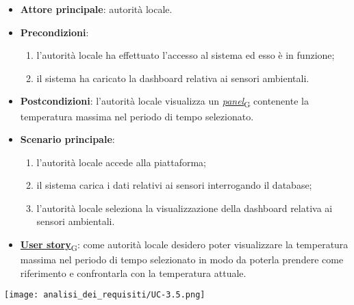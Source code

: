 \begin{itemize}
	\item \textbf{Attore principale}: autorità locale.
	\item \textbf{Precondizioni}:
	      \begin{enumerate}
		      \item l'autorità locale ha effettuato l'accesso al sistema ed esso è in funzione;
		      \item il sistema ha caricato la dashboard relativa ai sensori ambientali.
	      \end{enumerate}
	\item \textbf{Postcondizioni}: l'autorità locale visualizza un \href{https://7last.github.io/docs/pb/documentazione-interna/glossario\#panel}{\textit{panel}\textsubscript{G}} contenente la temperatura massima nel periodo di tempo selezionato.
	\item \textbf{Scenario principale}:
	      \begin{enumerate}
		      \item l'autorità locale accede alla piattaforma;
		      \item il sistema carica i dati relativi ai sensori interrogando il database;
		      \item l'autorità locale seleziona la visualizzazione della dashboard relativa ai sensori ambientali.
	      \end{enumerate}
	\item \href{https://7last.github.io/docs/pb/documentazione-interna/glossario\#user-story}{\textbf{User story}\textsubscript{G}}:
	      come autorità locale desidero poter visualizzare la temperatura massima nel periodo di tempo selezionato
	      in modo da poterla prendere come riferimento e confrontarla con la temperatura attuale.
\end{itemize}
\begin{center}
	\texttt{[image: analisi\_dei\_requisiti/UC-3.5.png]}
\end{center}


